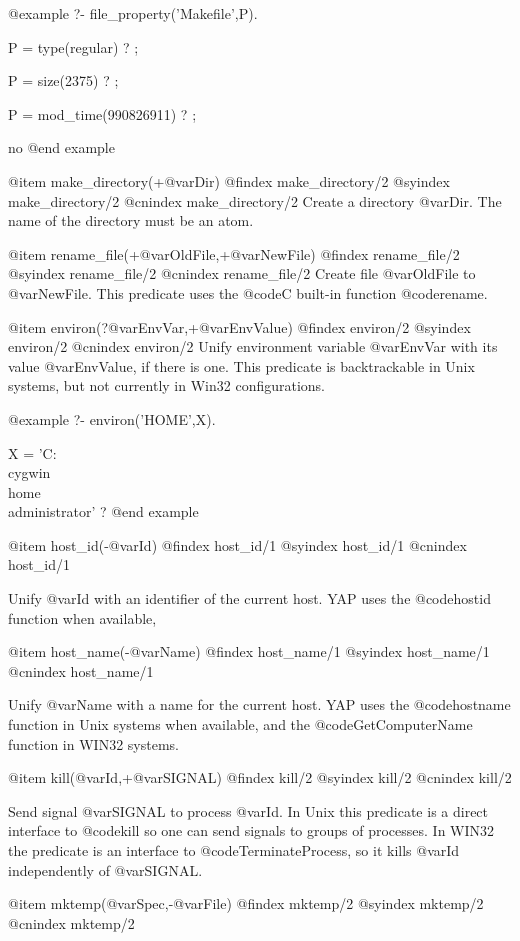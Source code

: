 {{{{{{{{{@example
   ?- file_property('Makefile',P).

P = type(regular) ? ;

P = size(2375) ? ;

P = mod_time(990826911) ? ;

no
@end example

@item make_directory(+@var{Dir})
@findex  make_directory/2
@syindex make_directory/2
@cnindex make_directory/2
Create a directory @var{Dir}. The name of the directory must be an atom.

@item rename_file(+@var{OldFile},+@var{NewFile})
@findex  rename_file/2
@syindex rename_file/2
@cnindex rename_file/2
Create file @var{OldFile} to @var{NewFile}. This predicate uses the
@code{C} built-in function @code{rename}.


@item environ(?@var{EnvVar},+@var{EnvValue})
@findex  environ/2
@syindex environ/2
@cnindex environ/2
Unify environment variable @var{EnvVar} with its value @var{EnvValue},
if there is one. This predicate is backtrackable in Unix systems, but
not currently in Win32 configurations.

@example
   ?- environ('HOME',X).

X = 'C:\\cygwin\\home\\administrator' ?
@end example

@item host_id(-@var{Id})
@findex  host_id/1
@syindex host_id/1
@cnindex host_id/1

Unify @var{Id} with an identifier of the current host. YAP uses the
@code{hostid} function when available, 

@item host_name(-@var{Name})
@findex  host_name/1
@syindex host_name/1
@cnindex host_name/1

Unify @var{Name} with a name for the current host. YAP uses the
@code{hostname} function in Unix systems when available, and the
@code{GetComputerName} function in WIN32 systems. 

@item kill(@var{Id},+@var{SIGNAL})
@findex  kill/2
@syindex kill/2
@cnindex kill/2

Send signal @var{SIGNAL} to process @var{Id}. In Unix this predicate is
a direct interface to @code{kill} so one can send signals to groups of
processes. In WIN32 the predicate is an interface to
@code{TerminateProcess}, so it kills @var{Id} independently of @var{SIGNAL}.

@item mktemp(@var{Spec},-@var{File})
@findex  mktemp/2
@syindex mktemp/2
@cnindex mktemp/2

}}}}}}}}}
